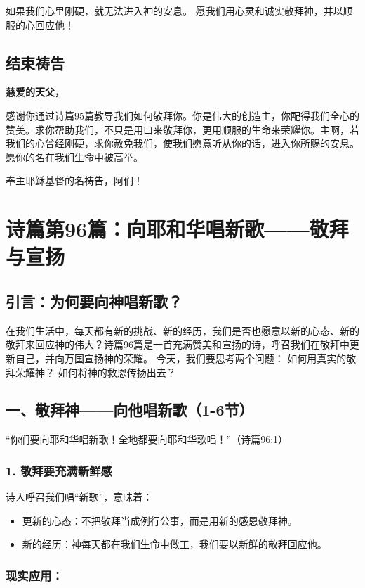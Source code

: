 \documentclass[a4paper, 12pt]{article}
\begin{document}
如果我们心里刚硬，就无法进入神的安息。
愿我们用心灵和诚实敬拜神，并以顺服的心回应他！

\subsection*{结束祷告}
\textbf{慈爱的天父，}

感谢你通过诗篇95篇教导我们如何敬拜你。你是伟大的创造主，你配得我们全心的赞美。求你帮助我们，不只是用口来敬拜你，更用顺服的生命来荣耀你。主啊，若我们的心曾经刚硬，求你赦免我们，使我们愿意听从你的话，进入你所赐的安息。愿你的名在我们生命中被高举。

奉主耶稣基督的名祷告，阿们！
\newpage
\section{诗篇第96篇：向耶和华唱新歌——敬拜与宣扬}
\subsection*{引言：为何要向神唱新歌？}
在我们生活中，每天都有新的挑战、新的经历，我们是否也愿意以新的心态、新的敬拜来回应神的伟大？诗篇96篇是一首充满赞美和宣扬的诗，呼召我们在敬拜中更新自己，并向万国宣扬神的荣耀。
今天，我们要思考两个问题：
如何用真实的敬拜荣耀神？
如何将神的救恩传扬出去？
\subsection*{一、敬拜神——向他唱新歌（1-6节）}
“你们要向耶和华唱新歌！全地都要向耶和华歌唱！”（诗篇96:1）

\subsubsection*{1. 敬拜要充满新鲜感}
诗人呼召我们唱“新歌”，意味着：
\begin{itemize}
    \item 更新的心态：不把敬拜当成例行公事，而是用新的感恩敬拜神。

    \item 新的经历：神每天都在我们生命中做工，我们要以新鲜的敬拜回应他。

\end{itemize}
\subsubsection*{现实应用：}
\end{document}
